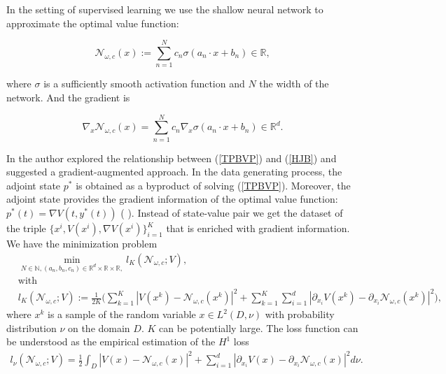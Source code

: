 \documentclass[12pt,fleqn]{amsart}
\theoremstyle{definition}
\begin{document}
In the setting of supervised learning we use the shallow neural network to approximate the optimal value function:

\begin{equation}
	\mathcal{N}_{\omega, c}(x) := \sum_{n = 1}^N c_n \sigma (a_n \cdot x + b_n) \in \mathbb{R},
\end{equation}

where $\sigma$ is a sufficiently smooth activation function and $N$ the width of the network. And the gradient is

\begin{equation*}
	\nabla_x  \mathcal{N}_{\omega, c}(x) =  \sum_{ n = 1}^N c_n \nabla_x \sigma(a_n \cdot x + b_n) \in \mathbb{R}^d .
\end{equation*}

In \cite{azmi2021optimal} the author explored the relationship between (\ref{TPBVP}) and (\ref{HJB}) and suggested a gradient-augmented approach. 
In the data generating process, the adjoint state $p^*$ is obtained as a byproduct of solving (\ref{TPBVP}). 
Moreover, the adjoint state provides the gradient information of the optimal value function: $p^*(t) = \nabla V(t, y^*(t))$ (\cite{cristiani2010initialization} \cite{cannarsa1991some} \cite{clarke1987relationship}). 
Instead of state-value pair we get the dataset of the triple $\{x^i, V(x^i), \nabla V(x^i)\}_{i = 1}^K$ that is enriched with gradient information. 
We have the minimization problem
\begin{equation}
\label{lost_dis}
\begin{aligned}
	&\min_{N \in \mathbb{N}, (a_n, b_n, c_n) \in \mathbb{R}^d \times \mathbb{R} \times \mathbb{R}, } l_K (\mathcal{N}_{\omega, c}; V),\\
	& \text{with}\\
	& l_K (\mathcal{N}_{\omega, c}; V) := \frac{1}{2K} \bigg( \sum_{k = 1}^K  |V(x^k) - \mathcal{N}_{\omega, c} (x^k)|^2 +  \sum_{k = 1}^K \sum_{i = 1}^d | \partial_{x_i} V(x^k) - \partial_{x_i} \mathcal{N}_{\omega, c} (x^k) |^2 \bigg),
\end{aligned}
\end{equation}
where $x^k$ is a sample of the random variable $x \in L^2(D, \nu)$ with probability distribution $\nu$ on the domain $D$. 
$K$ can be potentially large. The loss function can be understood as the empirical estimation of the $H^1$ loss
\begin{align*}
	l_\nu (\mathcal{N}_{\omega, c}; V) = \frac{1}{2} \int_D |V(x) - \mathcal{N}_{\omega, c} (x)|^2 + \sum_{i = 1}^d | \partial_{x_i} V(x) - \partial_{x_i} \mathcal{N}_{\omega, c} (x) |^2 d\nu .
\end{align*}
\end{document}
